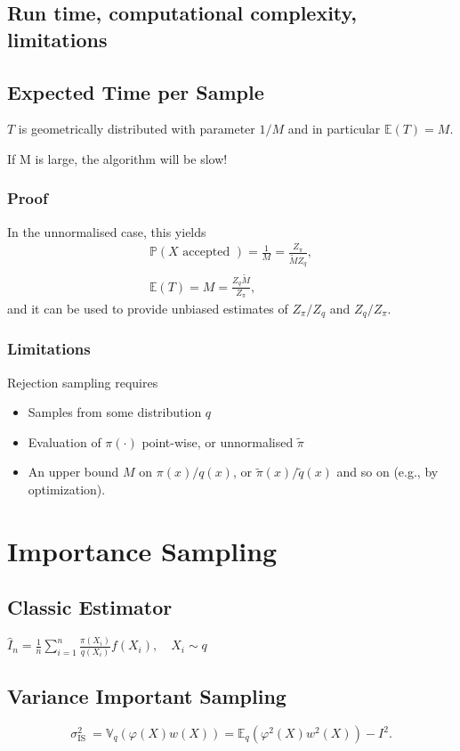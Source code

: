 \documentclass{article}
\begin{document}
\subsection{Run time, computational complexity, limitations}
\subsection{Expected Time per Sample}
$T$ is geometrically distributed with parameter $1 / M$ and in particular $\mathbb{E}(T)=M$. 

If M is large, the algorithm will be slow!


\subsubsection{Proof}
In the unnormalised case, this yields
$$
\begin{gathered}
\mathbb{P}(X \text { accepted })=\frac{1}{M}=\frac{Z_\pi}{\widetilde{M} Z_q}, \\
\mathbb{E}(T)=M=\frac{Z_q \widetilde{M}}{Z_\pi},
\end{gathered}
$$
and it can be used to provide unbiased estimates of $Z_\pi / Z_q$ and $Z_q / Z_\pi$.

\subsubsection{Limitations}
Rejection sampling requires
\begin{itemize}
    \item Samples from some distribution $q$
    \item Evaluation of $\pi(\cdot)$ point-wise, or unnormalised $\tilde{\pi}$ 
    \item An upper bound $M$ on $\pi(x) / q(x)$, or $\tilde{\pi}(x) / \widetilde{q}(x)$ and so on (e.g., by optimization).
\end{itemize}


\section{Importance Sampling}
\subsection{Classic Estimator}
$\hat{I}_n=\frac{1}{n} \sum_{i=1}^n \frac{\pi\left(X_i\right)}{q\left(X_i\right)} f\left(X_i\right), \quad X_i \sim q$

\subsection{Variance Important Sampling}
$$
\sigma_{\text {IS }}^2=\mathbb{V}_q(\varphi(X) w(X))=\mathbb{E}_q\left(\varphi^2(X) w^2(X)\right)-I^2 .
$$
\end{document}

